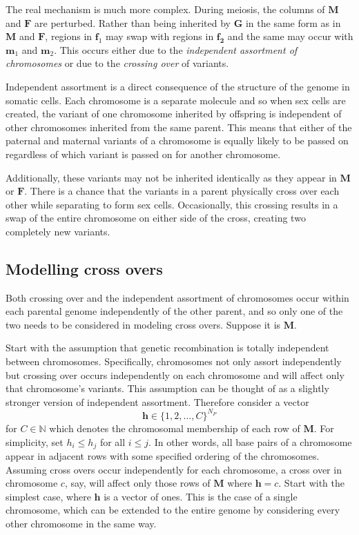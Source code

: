 \documentclass[sts]{imsart}
\newcommand{\ve}[1]{\mathbf{#1}}           %
\newcommand{\m}[1]{\mathbf{#1}}               %
\newcommand{\field}[1]{\mathbb{#1}}
\newcommand{\Naturals}{\field{N}}
\begin{document}
The real mechanism is much more complex. During meiosis, the columns of $\m{M}$ and $\m{F}$ are perturbed. Rather than being inherited by $\m{G}$ in the same form as in $\m{M}$ and $\m{F}$, regions in $\ve{f}_1$ may swap with regions in $\ve{f_2}$ and the same may occur with $\ve{m}_1$ and $\ve{m}_2$. This occurs either due to the \emph{independent assortment of chromosomes} or due to the \emph{crossing over} of variants.

Independent assortment is a direct consequence of the structure of the genome in somatic cells. Each chromosome is a separate molecule and so when sex cells are created, the variant of one chromosome inherited by offspring is independent of other chromosomes inherited from the same parent. This means that either of the paternal and maternal variants of a chromosome is equally likely to be passed on regardless of which variant is passed on for another chromosome.

Additionally, these variants may not be inherited identically as they appear in $\m{M}$ or $\m{F}$. There is a chance that the variants in a parent physically cross over each other while separating to form sex cells. Occasionally, this crossing results in a swap of the entire chromosome on either side of the cross, creating two completely new variants.

\subsection{Modelling cross overs} \label{subsec:modelcrossing}

Both crossing over and the independent assortment of chromosomes occur within each parental genome independently of the other parent, and so only one of the two needs to be considered in modeling cross overs. Suppose it is $\m{M}$.

Start with the assumption that genetic recombination is totally independent between chromosomes. Specifically, chromosomes not only assort independently but crossing over occurs independently on each chromosome and will affect only that chromosome's variants. This assumption can be thought of as a slightly stronger version of independent assortment. Therefore consider a vector
$$\ve{h} \in \{1, 2, \dots, C\}^{N_P}$$
for $C \in \Naturals$ which denotes the chromosomal membership of each row of $\m{M}$. For simplicity, set $h_i \leq h_j$ for all $i \leq j$. In other words, all base pairs of a chromosome appear in adjacent rows with some specified ordering of the chromosomes. Assuming cross overs occur independently for each chromosome, a cross over in chromosome $c$, say, will affect only those rows of $\m{M}$ where $\ve{h} = c$. Start with the simplest case, where $\ve{h}$ is a vector of ones. This is the case of a single chromosome, which can be extended to the entire genome by considering every other chromosome in the same way.
\end{document}

